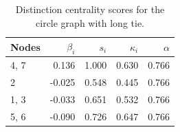 \begin{table}
\centering
\caption{\label{tab:circlelong}Distinction centrality scores for the circle graph with long tie.}
\centering
\begin{tabular}[t]{lrrrr}
\toprule
Nodes & $\beta_i$ & $s_i$ & $\kappa_i$ & $\alpha$\\
\midrule
4, 7 & 0.136 & 1.000 & 0.630 & 0.766\\
2 & -0.025 & 0.548 & 0.445 & 0.766\\
1, 3 & -0.033 & 0.651 & 0.532 & 0.766\\
5, 6 & -0.090 & 0.726 & 0.647 & 0.766\\
\bottomrule
\end{tabular}
\end{table}
